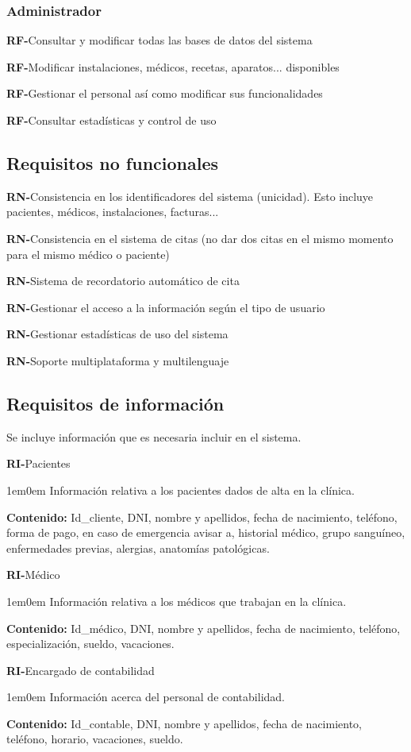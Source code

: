 \documentclass[12pt,a4paper]{article}
\newcounter{RFCounter}
\newcommand{\rf}[1]{\addtocounter{RFCounter}{1}\textbf{\rmfamily RF-\theRFCounter}\quad#1\\}
\newcounter{RNCounter}
\newcommand{\rn}[1]{\addtocounter{RNCounter}{1}\textbf{\rmfamily RN-\theRNCounter}\quad#1\\}
\newcounter{RICounter}
\newenvironment{rienv}[1]
	{\addtocounter{RICounter}{1}\textbf{\rmfamily RI-\theRICounter}\quad#1\begin{adjustwidth}{1em}{0em}}
	{\end{adjustwidth}}
\begin{document}
\subsubsection{Administrador}
    \rf{Consultar y modificar todas las bases de datos del sistema}
    \rf{Modificar instalaciones, médicos, recetas, aparatos... disponibles}
    \rf{Gestionar el personal así como modificar sus funcionalidades}
    \rf{Consultar estadísticas y control de uso}

\subsection{Requisitos no funcionales}
  \rn{Consistencia en los identificadores del sistema (unicidad). Esto incluye pacientes, médicos, instalaciones, facturas...}
  \rn{Consistencia en el sistema de citas (no dar dos citas en el mismo momento para el mismo médico o paciente)}
  \rn{Sistema de recordatorio automático de cita}
  \rn{Gestionar el acceso a la información según el tipo de usuario}
  \rn{Gestionar estadísticas de uso del sistema}
  \rn{Soporte multiplataforma y multilenguaje}


\subsection{Requisitos de información}

Se incluye información que es necesaria incluir en el sistema.

\begin{rienv}{Pacientes}
  Información relativa a los pacientes dados de alta en la clínica.

  \textbf{Contenido:} Id\_cliente, DNI, nombre y apellidos, fecha de nacimiento, teléfono, forma de pago, en caso de emergencia avisar a, historial médico, grupo sanguíneo, enfermedades previas, alergias, anatomías patológicas.
\end{rienv}

\begin{rienv}{Médico}
	Información relativa a los médicos que trabajan en la clínica.

	\textbf{Contenido:} Id\_médico, DNI, nombre y apellidos, fecha de nacimiento, teléfono, especialización, sueldo, vacaciones.
\end{rienv}

\begin{rienv}{Encargado de contabilidad}
  Información acerca del personal de contabilidad.

  \textbf{Contenido:} Id\_contable, DNI, nombre y apellidos, fecha de nacimiento, teléfono, horario, vacaciones, sueldo.
\end{rienv}  
  
\end{document}
